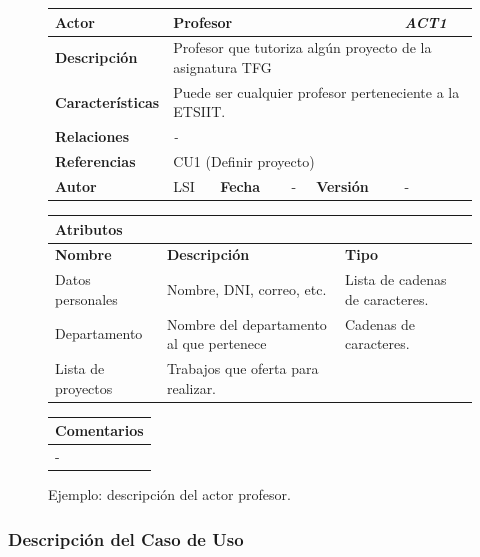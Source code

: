 \documentclass[12pt,spanish]{article}
\begin{document}
\begin{figure}[H]
\centering
\begin{tabular}{|m{3cm}|m{4cm}|m{2cm}|m{2cm}|m{2cm}|m{1cm}|}
\hline
\textbf{Actor} &  \multicolumn{4}{m{8cm}|}{Profesor} & \cellcolor{gray!40} \textit{ACT1} \\
\hline
\textbf{Descripción} & \multicolumn{5}{m{8cm}|}{Profesor que tutoriza algún proyecto de la asignatura TFG} \\
\hline
\textbf{Características} & \multicolumn{5}{m{8cm}|}{Puede ser cualquier profesor perteneciente a la ETSIIT.} \\
\hline
\textbf{Relaciones} &\multicolumn{5}{m{8cm}|}{\textit{-}} \\
\hline
\textbf{Referencias} & \multicolumn{5}{m{8cm}|}{CU1 (Definir proyecto)} \\
\hline
\textbf{Autor} & LSI & \textbf{Fecha} & - & \textbf{Versión} & - \\
\hline
\end{tabular}

\vspace{1cm}

\begin{tabular}{|m{4cm}|m{7.3cm}|m{4cm}|}
\hline
\multicolumn{3}{|m{15.3cm}|}{\textbf{Atributos}} \\
\hline
\textbf{Nombre} & \textbf{Descripción} & \textbf{Tipo} \\
\hline
Datos personales & Nombre, DNI, correo, etc. & Lista de cadenas de caracteres. \\
 \hline
Departamento & Nombre del departamento al que pertenece & Cadenas de caracteres. \\
\hline
Lista de proyectos & Trabajos que oferta para realizar. &  \\
\hline

\end{tabular}

\vspace{1cm}

\begin{tabular}{|m{16.2cm}|}
\hline
\textbf{Comentarios} \\
\hline
- \\
\hline
\end{tabular}

\caption{Ejemplo: descripción del actor profesor.}

\end{figure}

\subsubsection{Descripción del Caso de Uso}
\end{document}
